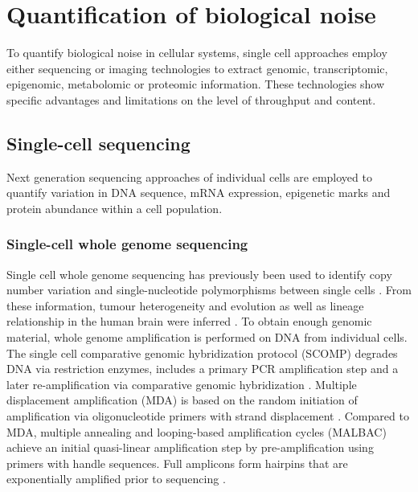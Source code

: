 
\section{Quantification of biological noise} 

To quantify biological noise in cellular systems, single cell approaches employ either sequencing or imaging technologies to extract genomic, transcriptomic, epigenomic, metabolomic or proteomic information. These technologies show specific advantages and limitations on the level of throughput and content.


\subsection{Single-cell sequencing}

Next generation sequencing approaches of individual cells are employed to quantify variation in DNA sequence, mRNA expression, epigenetic marks and protein abundance within a cell population. 

\subsubsection{Single-cell whole genome sequencing}

Single cell whole genome sequencing has previously been used to identify copy number variation and single-nucleotide polymorphisms between single cells \citep{Shpunt2012}. From these information, tumour heterogeneity and evolution \citep{Navin2011} as well as lineage relationship in the human brain were inferred \citep{Evrony2015}. To obtain enough genomic material, whole genome amplification is performed on DNA from individual cells. The single cell comparative genomic hybridization protocol (SCOMP) degrades DNA via restriction enzymes, includes a primary PCR amplification step and a later re-amplification via comparative genomic hybridization \citep{Klein1999}. Multiple displacement amplification (MDA) is based on the random initiation of amplification via oligonucleotide primers with strand displacement \citep{Dean2002}. Compared to MDA, multiple annealing and looping-based amplification cycles (MALBAC) achieve an initial quasi-linear amplification step by pre-amplification using primers with handle sequences. Full amplicons form hairpins that are exponentially amplified prior to sequencing \citep{Shpunt2012}. 

